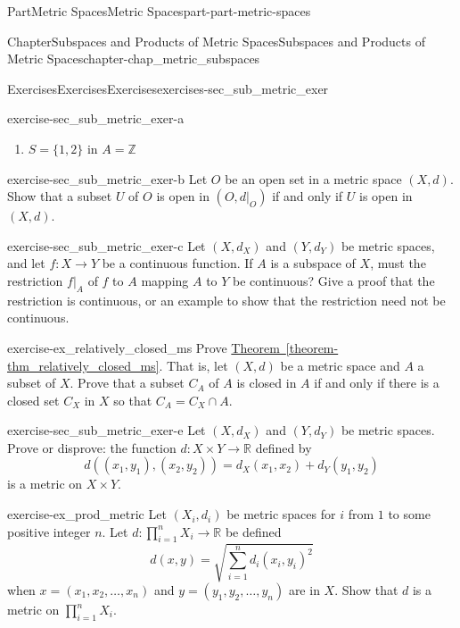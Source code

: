 \documentclass[oneside,10pt,]{book}
\newcommand{\xreffont}{\relax}
\numberwithin{equation}{chapter}
\newcommand{\Z}{\mathbb{Z}}
\newcommand{\R}{\mathbb{R}}
\begin{document}
\begin{partptx}{Part}{Metric Spaces}{}{Metric Spaces}{}{}{part-part-metric-spaces}
\begin{chapterptx}{Chapter}{Subspaces and Products of Metric Spaces}{}{Subspaces and Products of Metric Spaces}{}{}{chapter-chap_metric_subspaces}
\begin{exercises-section}{Exercises}{Exercises}{}{Exercises}{}{}{exercises-sec_sub_metric_exer}
\begin{divisionexercise}{1}{}{}{exercise-sec_sub_metric_exer-a}
\begin{enumerate}[font=\bfseries,label=(\alph*),ref=\alph*]
\item{}\(S = \{1,2\}\) in \(A = \Z\)%
\end{enumerate}%
\end{divisionexercise}%
\begin{divisionexercise}{2}{}{}{exercise-sec_sub_metric_exer-b}%
Let \(O\) be an open set in a metric space \((X,d)\). Show that a subset \(U\) of \(O\) is open in \((O, d|_O)\) if and only if \(U\) is open in \((X,d)\).%
\end{divisionexercise}%
\begin{divisionexercise}{3}{}{}{exercise-sec_sub_metric_exer-c}%
Let \((X,d_X)\) and \((Y, d_Y)\) be metric spaces, and let \(f : X \to Y\) be a continuous function. If \(A\) is a subspace of \(X\), must the restriction \(f|_A\) of \(f\) to \(A\) mapping \(A\) to \(Y\) be continuous? Give a proof that the restriction is continuous, or an example to show that the restriction need not be continuous.%
\end{divisionexercise}%
\begin{divisionexercise}{4}{}{}{exercise-ex_relatively_closed_ms}%
Prove \hyperref[theorem-thm_relatively_closed_ms]{Theorem~{\xreffont\ref{theorem-thm_relatively_closed_ms}}}. That is, let \((X,d)\) be a metric space and \(A\) a subset of \(X\). Prove that a subset \(C_A\) of \(A\) is closed in \(A\) if and only if there is a closed set \(C_X\) in \(X\) so that \(C_A = C_X \cap A\).%
\end{divisionexercise}%
\begin{divisionexercise}{5}{}{}{exercise-sec_sub_metric_exer-e}%
Let \((X,d_X)\) and \((Y,d_Y)\) be metric spaces. Prove or disprove: the function \(d: X \times Y \to \R\) defined by%
\begin{equation*}
d((x_1,y_1), (x_2,y_2)) = d_X(x_1,x_2) + d_Y(y_1,y_2)
\end{equation*}
is a metric on \(X \times Y\).%
\end{divisionexercise}%
\begin{divisionexercise}{6}{}{}{exercise-ex_prod_metric}%
Let \((X_i, d_i)\) be metric spaces for \(i\) from \(1\) to some positive integer \(n\). Let \(d: \prod_{i=1}^n X_i \to \R\) be defined%
\begin{equation*}
d(x,y) = \sqrt{\sum_{i=1}^n d_i(x_i,y_i)^2}
\end{equation*}
when \(x = (x_1, x_2, \ldots,
x_n)\) and \(y = (y_1, y_2, \ldots, y_n)\) are in \(X\). Show that \(d\) is a metric on \(\prod_{i=1}^n X_i\).%
\end{divisionexercise}%

\end{exercises-section}
\end{chapterptx}
\end{partptx}
\end{document}
